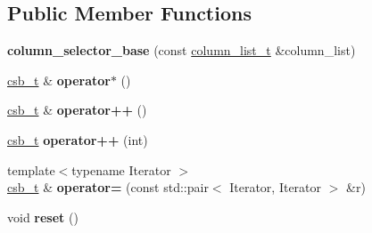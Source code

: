 \subsection*{Public Member Functions}
\begin{DoxyCompactItemize}
\item 
\hypertarget{classstrtk_1_1details_1_1column__selector__base_a2c9751f9c2f54ead69cab6b00cf31df7}{{\bfseries column\-\_\-selector\-\_\-base} (const \hyperlink{structstrtk_1_1details_1_1column__list__impl}{column\-\_\-list\-\_\-t} \&column\-\_\-list)}\label{classstrtk_1_1details_1_1column__selector__base_a2c9751f9c2f54ead69cab6b00cf31df7}

\item 
\hypertarget{classstrtk_1_1details_1_1column__selector__base_a77297467fc6cd242c9ab73622b59de4b}{\hyperlink{classstrtk_1_1details_1_1column__selector__base}{csb\-\_\-t} \& {\bfseries operator$\ast$} ()}\label{classstrtk_1_1details_1_1column__selector__base_a77297467fc6cd242c9ab73622b59de4b}

\item 
\hypertarget{classstrtk_1_1details_1_1column__selector__base_a3f185265ebba5af503bdb834bfe2ba43}{\hyperlink{classstrtk_1_1details_1_1column__selector__base}{csb\-\_\-t} \& {\bfseries operator++} ()}\label{classstrtk_1_1details_1_1column__selector__base_a3f185265ebba5af503bdb834bfe2ba43}

\item 
\hypertarget{classstrtk_1_1details_1_1column__selector__base_a3dedc2fa37e3f56574297384472d1a6d}{\hyperlink{classstrtk_1_1details_1_1column__selector__base}{csb\-\_\-t} {\bfseries operator++} (int)}\label{classstrtk_1_1details_1_1column__selector__base_a3dedc2fa37e3f56574297384472d1a6d}

\item 
\hypertarget{classstrtk_1_1details_1_1column__selector__base_a6ff2e0c1ea5ea15d1414a6552bd8a334}{{\footnotesize template$<$typename Iterator $>$ }\\\hyperlink{classstrtk_1_1details_1_1column__selector__base}{csb\-\_\-t} \& {\bfseries operator=} (const std\-::pair$<$ Iterator, Iterator $>$ \&r)}\label{classstrtk_1_1details_1_1column__selector__base_a6ff2e0c1ea5ea15d1414a6552bd8a334}

\item 
\hypertarget{classstrtk_1_1details_1_1column__selector__base_a6a43ee8773d86b4ee4d100e856b5db33}{void {\bfseries reset} ()}\label{classstrtk_1_1details_1_1column__selector__base_a6a43ee8773d86b4ee4d100e856b5db33}

\end{DoxyCompactItemize}
